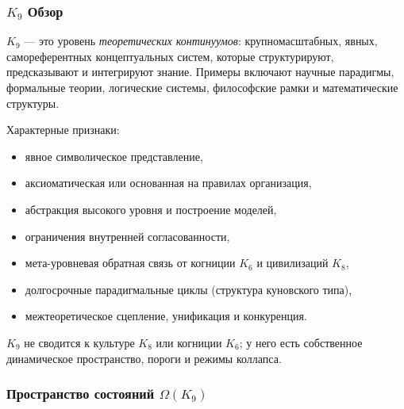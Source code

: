 

\subsubsection{\texorpdfstring{$K_9$}{K_9} Обзор}
\label{sec:k9-overview}

$K_9$ — это уровень \emph{теоретических континуумов}: крупномасштабных, явных,
самореферентных концептуальных систем, которые структурируют, предсказывают и интегрируют
знание. Примеры включают научные парадигмы, формальные теории, логические
системы, философские рамки и математические структуры.

Характерные признаки:
\begin{itemize}
    \item явное символическое представление,
    \item аксиоматическая или основанная на правилах организация,
    \item абстракция высокого уровня и построение моделей,
    \item ограничения внутренней согласованности,
    \item мета-уровневая обратная связь от когниции $K_6$ и цивилизаций $K_8$,
    \item долгосрочные парадигмальные циклы (структура куновского типа),
    \item межтеоретическое сцепление, унификация и конкуренция.
\end{itemize}

$K_9$ не сводится к культуре $K_8$ или когниции $K_6$; у него есть собственное
динамическое пространство, пороги и режимы коллапса.

\subsubsection{Пространство состояний \texorpdfstring{$\Omega(K_9)$}{\Omega(K_9)}}

